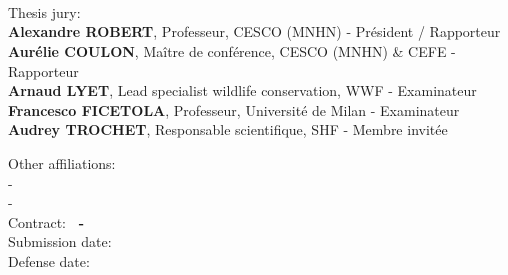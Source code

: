 


\cleardoublepage
{}
\thispagestyle{empty}

\begin{center}
    {%
        \Large\scshape\bfseries\setTitleFont\color{myColorPrimary}\portfolioMainTitle\\
    }%
    \vspace{0.1cm}
    {%
        \normalsize\setTitleFont\color{myColorPrimary}\portfolioSubTitle\\
    }%
    \vspace{0.1cm}
    {%
    \TEXTby\ \portfolioAuthorName%
    }%
\end{center}
%
\vspace*{0.5cm}
%
\begin{flushleft}
    \small
    \singlespace

    \vfill

    Thesis jury:\\
    \smallskip
    \hspace{4mm}\textbf{Alexandre ROBERT}, Professeur, CESCO (MNHN) -  Président / Rapporteur \\
    \hspace{4mm}\textbf{Aurélie COULON}, Maître de conférence, CESCO (MNHN) \& CEFE - Rapporteur \\
    \hspace{4mm}\textbf{Arnaud LYET}, Lead specialist wildlife conservation, WWF - Examinateur\\
    \hspace{4mm}\textbf{Francesco FICETOLA}, Professeur, Université de Milan - Examinateur\\
    \hspace{4mm}\textbf{Audrey TROCHET}, Responsable scientifique, SHF - Membre invitée\\

    \vfill

    Other affiliations:\\
    \smallskip
    \hspace{4mm}\textbf{\portfolioInstituteShort} - \portfolioInstituteLong\\
    \hspace{4mm}\textbf{\portfolioUniversityShort} - \portfolioUniversityLong\\


    \vfill
    Contract: \textbf{
        \portfolioDateContractStart\ - \portfolioDateContractEnd
        }\\
    Submission date: \textbf{\portfolioDateManuscript}\\
    Defense date: \textbf{\portfolioDateDefense}
    \vfill
\end{flushleft}%

